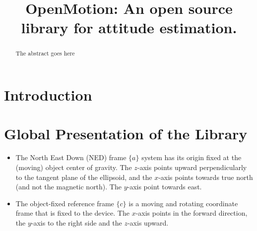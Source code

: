 \documentclass[conference]{IEEEtran}
\begin{document}
 \title{\fontsize{24pt}{10pt}\selectfont\textbf{OpenMotion}: An open source library for attitude estimation.} 

\author{
\and
{}
\and
{}
}

\maketitle

\thispagestyle{fancy}
\fancyhead{}
\lhead{}
\lfoot{}
\cfoot{}
\rfoot{}
\renewcommand{\headrulewidth}{0pt}
\renewcommand{\footrulewidth}{0pt}

\def\mathbi#1{\textbf{\em #1}}
\makeatletter
\newcommand*{\rom}[1]{\expandafter\@slowromancap\romannumeral #1@}
\makeatother






\begin{abstract}
The abstract goes here
\end{abstract}



\IEEEpeerreviewmaketitle

\section{Introduction}


\section{Global Presentation of the Library}






\begin{itemize}
\item The North East Down (NED) frame $\{a\}$ system has its origin fixed at the (moving) object center of gravity. The $z$-axis points upward perpendicularly to the tangent plane of the ellipsoid, and the $x$-axis points towards true north (and not the magnetic north). The $y$-axis point towards east.

\vspace{0.1cm}

\item The object-fixed reference frame $\{c\}$ is a moving and rotating coordinate frame that is fixed to the device. The $x$-axis points in the forward direction, the $y$-axis to the right side and the $z$-axis upward. 
\end{itemize}
\end{document}
